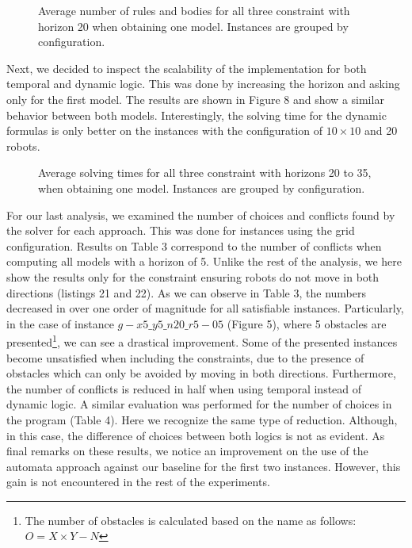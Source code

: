 \begin{figure}[]
    \centering
    
    
    \caption{Average number of rules and bodies for all three constraint with horizon 20 when obtaining one model. Instances are grouped by configuration. }
\end{figure}


Next, we decided to inspect the scalability of the implementation for both temporal and dynamic logic. This was done by increasing the horizon and asking only for the first model. The results are shown in Figure 8 and show a similar behavior between both models. Interestingly, the solving time for the dynamic formulas is only better on the instances with the configuration of $10\times 10$ and 20 robots.


\begin{figure}[]
    \centering
    
    
    \caption{Average solving times for all three constraint with horizons 20 to 35, when obtaining one model. Instances are grouped by configuration. }
\end{figure}


For our last analysis, we examined the number of choices and conflicts found by the solver for each approach. This was done for instances using the grid configuration. Results on Table 3 correspond to the number of conflicts when computing all models with a horizon of 5. 
Unlike the rest of the analysis, we here show the results only for the constraint ensuring robots do not move in both directions (listings 21 and 22). 
As we can observe in Table 3, the numbers decreased in over one order of magnitude for all satisfiable instances. 
Particularly, in the case of instance $g-x5\_y5\_n20\_r5-05$ (Figure 5), where 5 obstacles are presented\footnote{The number of obstacles is calculated based on the name as follows: $O=X\times Y-N$}, we can see a drastical improvement. Some of the presented instances become unsatisfied when including the constraints, due to the presence of obstacles which can only be avoided by moving in both directions. Furthermore, the number of conflicts is reduced in half when using temporal instead of dynamic logic.
A similar evaluation was performed for the number of choices in the program (Table 4). Here we recognize the same type of reduction. Although, in this case, the difference of choices between both logics is not as evident. As final remarks on these results, we notice an improvement on the use of the automata approach against our baseline for the first two instances. However, this gain is not encountered in the rest of the experiments.






